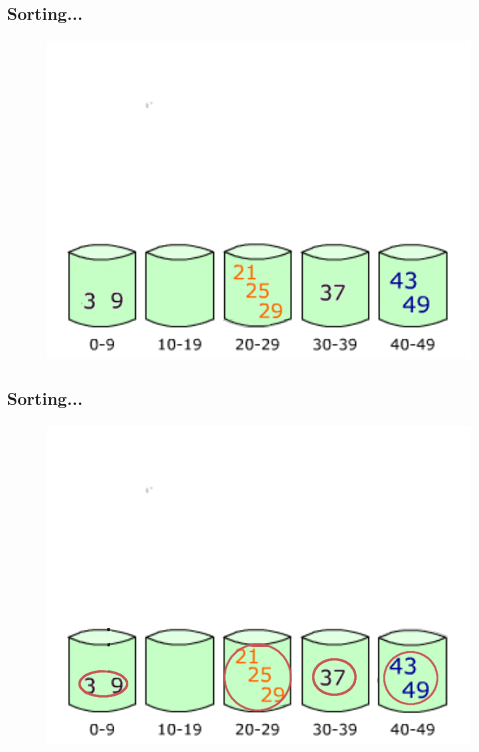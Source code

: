 \documentclass[pdf]{beamer}
\begin{document}
\begin{frame}
	\frametitle{Sorting...}
	\begin{figure}
		\includegraphics[scale=.3]{Figure/16.png}
	\end{figure}	
\end{frame}
\begin{frame}
	\frametitle{Sorting...}
	\begin{figure}
		\includegraphics[scale=.3]{Figure/17.png}
	\end{figure}	
\end{frame}
\end{document}
